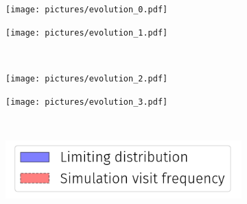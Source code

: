 \begin{frame}
    \begin{figure}
        \begin{subfigure}{.49\textwidth}
            \centering
            \texttt{[image: pictures/evolution\_0.pdf]}
          \end{subfigure}
          \begin{subfigure}{.49\textwidth}
            \centering
            \texttt{[image: pictures/evolution\_1.pdf]}
          \end{subfigure}\\
          \begin{subfigure}{0.49\textwidth}
            \centering
            \texttt{[image: pictures/evolution\_2.pdf]}
          \end{subfigure}%
          \begin{subfigure}{0.49\textwidth}
            \centering
            \texttt{[image: pictures/evolution\_3.pdf]}
        \end{subfigure}\\
        \begin{center}
          \begin{subfigure}{0.4\textwidth}
            \centering
            \includegraphics[width=\linewidth]{pictures/legend.png}
          \end{subfigure}\\
        \end{center}
        \end{figure}
\end{frame}

\begin{frame}
    
\end{frame}
